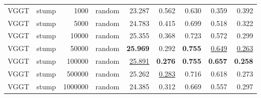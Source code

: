 \begin{table}[H]
\begin{tabular}{llrlrrrrr}
VGGT & stump & 1000 & random & 23.287 & 0.562 & 0.630 & 0.359 & 0.392 \\
VGGT & stump & 5000 & random & 24.783 & 0.415 & 0.699 & 0.518 & 0.322 \\
VGGT & stump & 10000 & random & 25.355 & 0.368 & 0.723 & 0.572 & 0.299 \\
VGGT & stump & 50000 & random & \textbf{25.969} & 0.292 & \textbf{0.755} & \underline{0.649} & \underline{0.263} \\
VGGT & stump & 100000 & random & \underline{25.891} & \textbf{0.276} & \textbf{0.755} & \textbf{0.657} & \textbf{0.258} \\
VGGT & stump & 500000 & random & 25.262 & \underline{0.283} & 0.716 & 0.618 & 0.273 \\
VGGT & stump & 1000000 & random & 24.385 & 0.312 & 0.669 & 0.557 & 0.297 \\
\bottomrule
\end{tabular}
\end{table}
